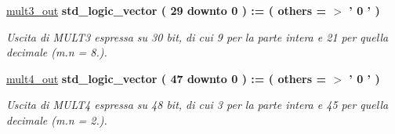 \begin{DoxyCompactItemize}
\hyperlink{group___linear_regression_gafc18f2d32e281bafbb9ecebb30a79221}{mult3\+\_\+out} {\bfseries \textcolor{vhdlchar}{std\+\_\+logic\+\_\+vector}\textcolor{vhdlchar}{ }\textcolor{vhdlchar}{(}\textcolor{vhdlchar}{ }\textcolor{vhdlchar}{ } \textcolor{vhdldigit}{29} \textcolor{vhdlchar}{ }\textcolor{vhdlchar}{downto}\textcolor{vhdlchar}{ }\textcolor{vhdlchar}{ } \textcolor{vhdldigit}{0} \textcolor{vhdlchar}{ }\textcolor{vhdlchar}{)}\textcolor{vhdlchar}{ }\textcolor{vhdlchar}{ }\textcolor{vhdlchar}{ }\textcolor{vhdlchar}{\+:}\textcolor{vhdlchar}{=}\textcolor{vhdlchar}{ }\textcolor{vhdlchar}{(}\textcolor{vhdlchar}{ }\textcolor{vhdlchar}{ }\textcolor{vhdlchar}{others}\textcolor{vhdlchar}{ }\textcolor{vhdlchar}{ }\textcolor{vhdlchar}{=}\textcolor{vhdlchar}{ }\textcolor{vhdlchar}{$>$}\textcolor{vhdlchar}{ }\textcolor{vhdlchar}{'}\textcolor{vhdlchar}{ } \textcolor{vhdldigit}{0} \textcolor{vhdlchar}{ }\textcolor{vhdlchar}{'}\textcolor{vhdlchar}{ }\textcolor{vhdlchar}{)}\textcolor{vhdlchar}{ }} 
\begin{DoxyCompactList}\small\item\em Uscita di M\+U\+L\+T3 espressa su 30 bit, di cui 9 per la parte intera e 21 per quella decimale (m.\+n = 8.). \end{DoxyCompactList}\item 
\hyperlink{group___linear_regression_ga5a0832f93305c3e0a37293a00e17a538}{mult4\+\_\+out} {\bfseries \textcolor{vhdlchar}{std\+\_\+logic\+\_\+vector}\textcolor{vhdlchar}{ }\textcolor{vhdlchar}{(}\textcolor{vhdlchar}{ }\textcolor{vhdlchar}{ } \textcolor{vhdldigit}{47} \textcolor{vhdlchar}{ }\textcolor{vhdlchar}{downto}\textcolor{vhdlchar}{ }\textcolor{vhdlchar}{ } \textcolor{vhdldigit}{0} \textcolor{vhdlchar}{ }\textcolor{vhdlchar}{)}\textcolor{vhdlchar}{ }\textcolor{vhdlchar}{ }\textcolor{vhdlchar}{ }\textcolor{vhdlchar}{\+:}\textcolor{vhdlchar}{=}\textcolor{vhdlchar}{ }\textcolor{vhdlchar}{(}\textcolor{vhdlchar}{ }\textcolor{vhdlchar}{ }\textcolor{vhdlchar}{others}\textcolor{vhdlchar}{ }\textcolor{vhdlchar}{ }\textcolor{vhdlchar}{=}\textcolor{vhdlchar}{ }\textcolor{vhdlchar}{$>$}\textcolor{vhdlchar}{ }\textcolor{vhdlchar}{'}\textcolor{vhdlchar}{ } \textcolor{vhdldigit}{0} \textcolor{vhdlchar}{ }\textcolor{vhdlchar}{'}\textcolor{vhdlchar}{ }\textcolor{vhdlchar}{)}\textcolor{vhdlchar}{ }} 
\begin{DoxyCompactList}\small\item\em Uscita di M\+U\+L\+T4 espressa su 48 bit, di cui 3 per la parte intera e 45 per quella decimale (m.\+n = 2.). \end{DoxyCompactList}\item 

\end{DoxyCompactItemize}
